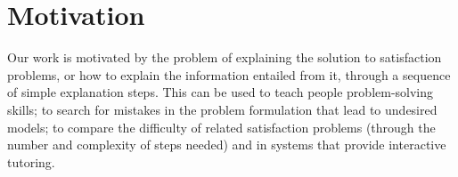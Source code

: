 \documentclass[a4paper,UKenglish,cleveref, autoref, thm-restate, pdfa]{lipics-v2021}
\newcommand\m[1]{\mathcal{#1}}
\renewcommand\comment[1]{}
\newcommand{\emilio}[1]{{\comment{\color{red}Emilio: #1}}}
\newcommand{\bart}[1]{{\comment{\color{OliveGreen}Bart: #1}}}
\newcommand\formulac{\ensuremath{\m{C} }\xspace}
\begin{document}
%		
	
	
	
	\section{Motivation}\label{sec:motivation}
	
	Our work is motivated by the problem of explaining the solution to satisfaction problems, or how to explain the information entailed from it,
	through a sequence of simple explanation steps. This can be used to teach people problem-solving skills; to search for mistakes in the problem formulation that lead to undesired models; to compare the difficulty of related satisfaction problems (through the number and complexity of steps needed) and in systems that provide interactive tutoring.  
	
\end{document}
